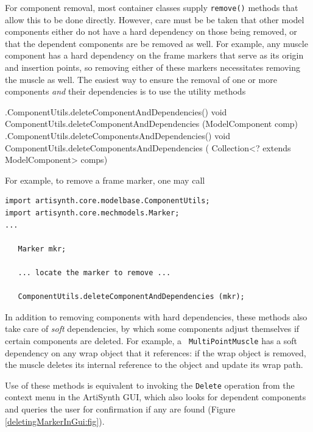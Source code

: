 For component removal, most container classes supply {\tt remove()} methods
that allow this to be done directly. However, care must be be taken that other
model components either do not have a hard dependency on those being removed,
or that the dependent components are be removed as well.  For example, any
muscle component has a hard dependency on the frame markers that serve as its
origin and insertion points, so removing either of these markers necessitates
removing the muscle as well. The easiest way to ensure the removal of
one or more components {\it and} their dependencies is to use the utility methods
%
\begin{methodtable}{0.98}{0.02}
\midline
%
\methodentry
{\mbase.ComponentUtils.deleteComponentAndDependencies()}%
{void ComponentUtils.deleteComponentAndDependencies (ModelComponent comp)}%
{\ }%
%
\methodspace{0.5em}%
\methodentry
{\mbase.ComponentUtils.deleteComponentsAndDependencies()}%
{void ComponentUtils.deleteComponentsAndDependencies (%
Collection<? extends ModelComponent> comps)}%
{\ }%
\midline
\end{methodtable}
%
For example, to remove a frame marker, one may call
%
\begin{lstlisting}[]
import artisynth.core.modelbase.ComponentUtils;
import artisynth.core.mechmodels.Marker;
...

   Marker mkr;
   
   ... locate the marker to remove ...

   ComponentUtils.deleteComponentAndDependencies (mkr);
\end{lstlisting}
%
In addition to removing components with hard dependencies, these methods also
take care of {\it soft} dependencies, by which some components adjust
themselves if certain components are deleted. For example, a {\tt
MultiPointMuscle} has a soft dependency on any wrap object that it references:
if the wrap object is removed, the muscle deletes its internal
reference to the object and update its wrap path.

\begin{sideblock}
Use of these methods is equivalent to invoking the {\tt Delete} operation from
the context menu in the ArtiSynth GUI, which also looks for dependent
components and queries the user for confirmation if any are found (Figure
\ref{deletingMarkerInGui:fig}).
\end{sideblock}


